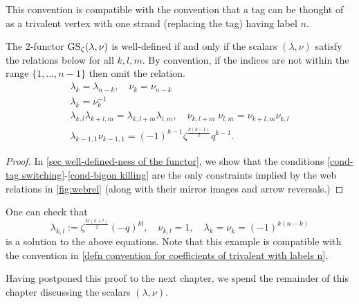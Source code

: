\begin{remark}\label{rmk compatibility of convention for lambdanu-k,(n-k) as lambdanu-k}
This convention is compatible with the convention that a tag can be thought of as a trivalent vertex with one strand (replacing the tag) having label $n$. 
\end{remark}

\begin{theorem} \label{thm dQGS functor}
The $2$-functor $\operatorname{GS}_{\zeta}(\lambda, \nu)$ is well-defined if and only if the scalars $(\lambda, \nu)$ satisfy the relations below for all $k, l, m$. By convention, if the indices are not within the range $\{1, \ldots, n-1\}$ then omit the relation. 
\begin{subequations} \label{scalarconditions}
\begin{gather}
   \lambda_k= \lambda_{n-k}, \quad \nu_k=\nu_{n-k} \label{cond-tag switching}\\ 
    \lambda_k= \nu_k^{-1}\label{cond-tag cancellation}\\ 
    \lambda_{k,l}\lambda_{k+l,m}= \lambda_{k,l+m}\lambda_{l,m}, \quad \nu_{k, l+m}\;\nu_{l,m}=\nu_{k+l,m}\nu_{k,l} \label{cond-I=H relation}\\  
    \lambda_{k-1,1}\nu_{k-1,1}= (-1)^{k-1}\zeta^{\frac{k(k-1)}{2}}q^{k-1}. \label{cond-bigon killing}
\end{gather}
\end{subequations}
\end{theorem}

\begin{proof}
In \cref{sec well-defined-ness of the functor}, we show that the conditions \cref{cond-tag switching}-\cref{cond-bigon killing} are the only constraints implied by the web relations in \cref{fig:webrel} (along with their mirror images and arrow reversals.)
\end{proof}

\begin{example} \label{goodchoiceoflambdanu}
One can check that 
\begin{equation} \lambda_{k,l}:=\zeta^{\frac{kl(k+l)}{2}}(-q)^{kl}, \quad \nu_{k,l}=1, \quad \lambda_{k}=\nu_k = (-1)^{k(n-k)} \end{equation} is a solution to the above equations.
Note that this example is compatible with the convention in \cref{defn convention for coefficients of trivalent with labels n}.
\end{example}

Having postponed this proof to the next chapter, we spend the remainder of this chapter discussing the scalars $(\lambda, \nu)$.




